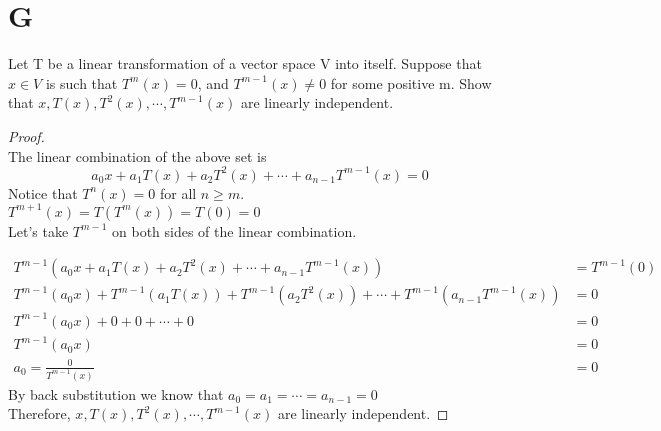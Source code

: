 \documentclass[11pt]{scrartcl}
\makeatletter
\newenvironment{Dequation}
  {%
  \def\tagform@##1{%
    \maketag@@@{\makebox[0pt][r]{(\ignorespaces##1\unskip\@@italiccorr)}}}%
  \ignorespaces
  }
  {%
  \def\tagform@##1{\maketag@@@{(\ignorespaces##1\unskip\@@italiccorr)}}%
  \ignorespacesafterend
  }
\makeatother
\begin{document}
\section{G}
Let T be a linear transformation of a vector space V into itself. Suppose that $x \in V$ is such that $T^m (x) = 0$, and
$T^{m-1}(x) \neq 0$ for some positive m. Show that $x,T(x),T^2(x),\cdots ,T^{m-1}(x)$ are linearly independent.
\begin{proof}
	\-\\
	The linear combination of the above set is $$ a_0x + a_1T(x) + a_2T^2(x) + \cdots + a_{n-1}T^{m-1}(x) = 0$$
	Notice that $T^n(x) = 0$ for all $n \geq m$.\\
	$T^{m+1}(x) = T(T^{m}(x)) = T(0) = 0$\\
	Let's take $T^{m-1}$ on both sides of the linear combination.	
	\begin{Dequation}
	\begin{align*}
		T^{m-1}(a_0x + a_1T(x) + a_2T^2(x) + \cdots + a_{n-1}T^{m-1}(x)) &= T^{m-1}(0)\\
		T^{m-1}(a_0x) + T^{m-1}(a_1T(x)) + T^{m-1}(a_2T^2(x)) + \cdots + T^{m-1}(a_{n-1}T^{m-1}(x)) &= 0 \\
		T^{m-1}(a_0x) + 0 + 0 + \cdots + 0 &= 0\\
		T^{m-1}(a_0x) &= 0\\
		a_0 = \frac{0}{T^{m-1}(x)} &= 0
	\end{align*}
	\end{Dequation}
	By back substitution we know that $a_0 = a_1 = \cdots = a_{n-1} = 0$\\
	Therefore, $x,T(x),T^2(x),\cdots ,T^{m-1}(x)$ are linearly independent.
\end{proof}
\end{document}
